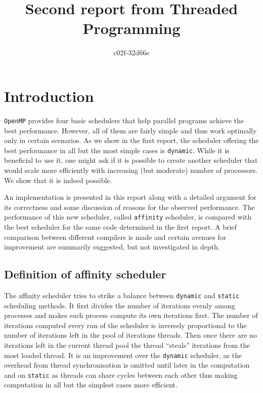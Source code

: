 \documentclass[11pt,a4paper]{article}
\begin{document}
\title{Second report from Threaded Programming}
\author{c02f-32d66e}
\maketitle

\section{Introduction}
\texttt{OpenMP} provides four basic schedulers that help parallel programs achieve the best performance. However, all of them are fairly simple and thus work optimally only in certain scenarios. As we show in the first report, the scheduler offering the best performance in all but the most simple cases is \texttt{dynamic}. While it is beneficial to use it, one might ask if it is possible to create another scheduler that would scale more efficiently with increasing (but moderate) number of processors. We show that it is indeed possible.

An implementation is presented in this report along with a detailed argument for its correctness and some discussion of reasons for the observed performance. The performance of this new scheduler, called \texttt{affinity} scheduler, is compared with the best scheduler for the same code determined in the first report. A brief comparison between different compilers is made and certain avenues for improvement are summarily suggested, but not investigated in depth.

\subsection{Definition of affinity scheduler}
The affinity scheduler tries to strike a balance between \texttt{dynamic} and \texttt{static} scheduling methods. 
It first divides the number of iterations evenly among processes and makes each process compute its own iterations first.
The number of iterations computed every run of the scheduler is inversely proportional to the number of iterations left in the pool of iterations threads.
Then once there are no iterations left in the current thread pool the thread ``steals'' iterations from the most loaded thread.
It is an improvement over the \texttt{dynamic} scheduler, as the overhead from thread synchronisation is omitted until later in the computation and on \texttt{static} as threads can share cycles between each other thus making computation in all but the simplest cases more efficient.
\end{document}
